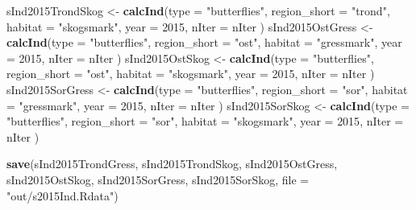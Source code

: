 \documentclass[]{article}
\newenvironment{Shaded}{\begin{snugshade}}{\end{snugshade}}
\newcommand{\KeywordTok}[1]{\textcolor[rgb]{0.13,0.29,0.53}{\textbf{#1}}}
\newcommand{\DataTypeTok}[1]{\textcolor[rgb]{0.13,0.29,0.53}{#1}}
\newcommand{\DecValTok}[1]{\textcolor[rgb]{0.00,0.00,0.81}{#1}}
\newcommand{\StringTok}[1]{\textcolor[rgb]{0.31,0.60,0.02}{#1}}
\newcommand{\NormalTok}[1]{#1}
\begin{document}
\begin{Shaded}
\begin{Highlighting}[]
\NormalTok{sInd2015TrondSkog <-}\StringTok{ }\KeywordTok{calcInd}\NormalTok{(}\DataTypeTok{type =} \StringTok{"butterflies"}\NormalTok{,}
                              \DataTypeTok{region_short =} \StringTok{"trond"}\NormalTok{,}
                              \DataTypeTok{habitat =} \StringTok{"skogsmark"}\NormalTok{,}
                              \DataTypeTok{year =} \DecValTok{2015}\NormalTok{,}
                              \DataTypeTok{nIter =}\NormalTok{ nIter}
\NormalTok{                              )}
\NormalTok{sInd2015OstGress <-}\StringTok{ }\KeywordTok{calcInd}\NormalTok{(}\DataTypeTok{type =} \StringTok{"butterflies"}\NormalTok{,}
                              \DataTypeTok{region_short =} \StringTok{"ost"}\NormalTok{,}
                              \DataTypeTok{habitat =} \StringTok{"gressmark"}\NormalTok{,}
                              \DataTypeTok{year =} \DecValTok{2015}\NormalTok{,}
                              \DataTypeTok{nIter =}\NormalTok{ nIter}
\NormalTok{                              )}
\NormalTok{sInd2015OstSkog <-}\StringTok{ }\KeywordTok{calcInd}\NormalTok{(}\DataTypeTok{type =} \StringTok{"butterflies"}\NormalTok{,}
                              \DataTypeTok{region_short =} \StringTok{"ost"}\NormalTok{,}
                              \DataTypeTok{habitat =} \StringTok{"skogsmark"}\NormalTok{,}
                              \DataTypeTok{year =} \DecValTok{2015}\NormalTok{,}
                              \DataTypeTok{nIter =}\NormalTok{ nIter}
\NormalTok{                              )}
\NormalTok{sInd2015SorGress <-}\StringTok{ }\KeywordTok{calcInd}\NormalTok{(}\DataTypeTok{type =} \StringTok{"butterflies"}\NormalTok{,}
                              \DataTypeTok{region_short =} \StringTok{"sor"}\NormalTok{,}
                              \DataTypeTok{habitat =} \StringTok{"gressmark"}\NormalTok{,}
                              \DataTypeTok{year =} \DecValTok{2015}\NormalTok{,}
                              \DataTypeTok{nIter =}\NormalTok{ nIter}
\NormalTok{                              )}
\NormalTok{sInd2015SorSkog <-}\StringTok{ }\KeywordTok{calcInd}\NormalTok{(}\DataTypeTok{type =} \StringTok{"butterflies"}\NormalTok{,}
                              \DataTypeTok{region_short =} \StringTok{"sor"}\NormalTok{,}
                              \DataTypeTok{habitat =} \StringTok{"skogsmark"}\NormalTok{,}
                              \DataTypeTok{year =} \DecValTok{2015}\NormalTok{,}
                              \DataTypeTok{nIter =}\NormalTok{ nIter}
\NormalTok{                              )}

\KeywordTok{save}\NormalTok{(sInd2015TrondGress, sInd2015TrondSkog, sInd2015OstGress, sInd2015OstSkog, sInd2015SorGress, sInd2015SorSkog, }\DataTypeTok{file =} \StringTok{"out/s2015Ind.Rdata"}\NormalTok{)}
\end{Highlighting}
\end{Shaded}
\end{document}
